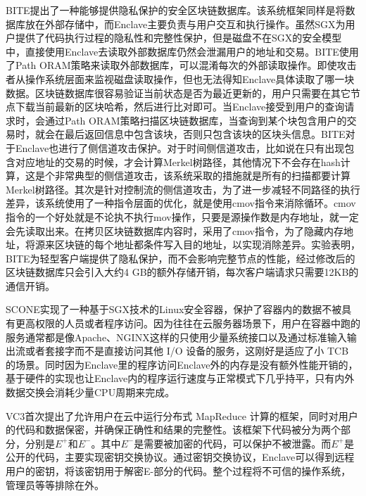 \documentclass[twocolumn]{source/Paper}
\begin{document}
        BITE\cite{matetic2019bite}提出了一种能够提供隐私保护的安全区块链数据库。该系统框架同样是将数据库放在外部存储中，而Enclave主要负责与用户交互和执行操作。虽然SGX为用户提供了代码执行过程的隐私性和完整性保护，但是磁盘不在SGX的安全模型中，直接使用Enclave去读取外部数据库仍然会泄漏用户的地址和交易。BITE使用了Path ORAM\cite{stefanov2018path}策略来读取外部数据库，可以混淆每次的外部读取操作。即使攻击者从操作系统层面来监视磁盘读取操作，但也无法得知Enclave具体读取了哪一块数据。区块链数据库很容易验证当前状态是否为最近更新的，用户只需要在其它节点下载当前最新的区块哈希，然后进行比对即可。当Enclave接受到用户的查询请求时，会通过Path ORAM策略扫描区块链数据库，当查询到某个块包含用户的交易时，就会在最后返回信息中包含该块，否则只包含该块的区块头信息。BITE对于Enclave也进行了侧信道攻击保护。对于时间侧信道攻击，比如说在只有出现包含对应地址的交易的时候，才会计算Merkel树路径，其他情况下不会存在hash计算，这是个非常典型的侧信道攻击，该系统采取的措施就是所有的扫描都要计算Merkel树路径。其次是针对控制流的侧信道攻击，为了进一步减轻不同路径的执行差异，该系统使用了一种指令层面的优化，就是使用cmov指令来消除循环。cmov指令的一个好处就是不论执不执行mov操作，只要是源操作数是内存地址，就一定会先读取出来。在拷贝区块链数据库内容时，采用了cmov指令，为了隐藏内存地址，将源来区块链的每个地址都条件写入目的地址，以实现消除差异。实验表明，BITE为轻型客户端提供了隐私保护，而不会影响完整节点的性能，经过修改后的区块链数据库只会引入大约4 GB的额外存储开销，每次客户端请求只需要12KB的通信开销。
        
        SCONE\cite{arnautov2016scone}实现了一种基于SGX技术的Linux安全容器，保护了容器内的数据不被具有更高权限的人员或者程序访问。因为往往在云服务器场景下，用户在容器中跑的服务通常都是像Apache、NGINX这样的只使用少量系统接口以及通过标准输入输出流或者套接字而不是直接访问其他 I/O 设备的服务，这刚好是适应了小 TCB 的场景。同时因为Enclave里的程序访问Enclave外的内存是没有额外性能开销的，基于硬件的实现也让Enclave内的程序运行速度与正常模式下几乎持平，只有内外数据交换会消耗少量CPU周期来完成。

        VC3\cite{schuster2015vc3}首次提出了允许用户在云中运行分布式 MapReduce 计算的框架，同时对用户的代码和数据保密，并确保正确性和结果的完整性。该框架下代码被分为两个部分，分别是$E^{+}$和$E^{-}$。其中$E^{-}$是需要被加密的代码，可以保护不被泄露。而$E^{+}$是公开的代码，主要实现密钥交换协议。通过密钥交换协议，Enclave可以得到远程用户的密钥，将该密钥用于解密E-部分的代码。整个过程将不可信的操作系统，管理员等等排除在外。
\end{document}
